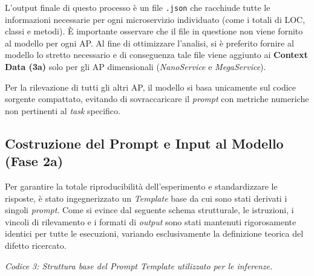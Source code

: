 \vspace{0.5em}
L'output finale di questo processo è un file \texttt{.json}  che racchiude tutte le informazioni necessarie per ogni microservizio individuato (come i totali di LOC, classi e metodi). È importante osservare che il file in questione non viene fornito al modello per ogni AP. Al fine di ottimizzare l'analisi, si è preferito fornire al modello lo stretto necessario e di conseguenza tale file viene aggiunto ai \textbf{Context Data (3a)} solo per gli AP dimensionali (\textit{NanoService} e \textit{MegaService}).

Per la rilevazione di tutti gli altri AP, il modello si basa unicamente sul codice sorgente compattato, evitando di sovraccaricare il \textit{prompt} con metriche numeriche non pertinenti al \textit{task} specifico.

\subsection{Costruzione del Prompt e Input al Modello (Fase 2a)}
\vspace{1em}
Per garantire la totale riproducibilità dell'esperimento e standardizzare le risposte, è stato ingegnerizzato un \textit{Template} base da cui sono stati derivati i singoli \textit{prompt}. Come si evince dal seguente schema strutturale, le istruzioni, i vincoli di rilevamento e i formati di \textit{output} sono stati mantenuti rigorosamente identici per tutte le esecuzioni, variando esclusivamente la definizione teorica del difetto ricercato.

\vspace{1em}
\noindent\textit{Codice 3: Struttura base del Prompt Template utilizzato per le inferenze.}
\vspace{0.5em}

